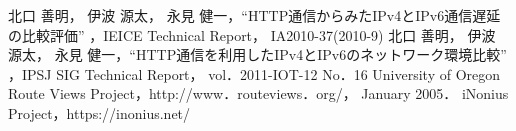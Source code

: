 \documentclass[rinkou,a4paper]{ieicej}
\begin{document}
\begin{thebibliography}{9} %
 北口 善明， 伊波 源太， 永見 健一，``HTTP通信からみたIPv4とIPv6通信遅延の比較評価'' ，IEICE Technical Report， IA2010-37(2010-9)
 北口 善明， 伊波 源太， 永見 健一，``HTTP通信を利用したIPv4とIPv6のネットワーク環境比較'' ，IPSJ SIG Technical Report， vol．2011-IOT-12 No．16
University of Oregon Route Views Project，http://www．routeviews．org/， January 2005．
iNonius Project，https://inonius.net/

\end{thebibliography}
\end{document}
